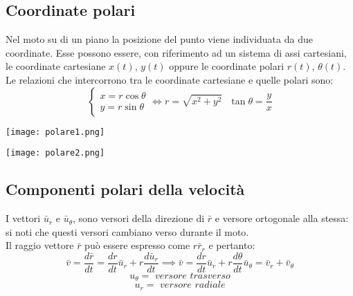 \documentclass[../../main.tex]{subfiles}
\begin{document}
\subsection{Coordinate polari}
Nel moto su di un piano la posizione del punto viene individuata da due coordinate. Esse possono essere, con riferimento ad un sistema di assi cartesiani, le coordinate cartesiane $x(t)$, $y(t)$ oppure le coordinate polari $r(t)$, $\theta(t)$. Le relazioni che intercorrono tra le coordinate cartesiane e quelle polari sono:
\[
    \begin{cases}
        x = r\cos\theta \\
        y = r\sin\theta
    \end{cases}
    \iff r = \sqrt{x^2 + y^2} \ \ \ \tan\theta = \dfrac{y}{x}
\]
\begin{minipage}{0.5\textwidth}
    \centering
    \texttt{[image: polare1.png]}
\end{minipage}
\begin{minipage}{0.5\textwidth}
    \centering
    \texttt{[image: polare2.png]}
\end{minipage}

\subsection{Componenti polari della velocità}
I vettori $\bar{u}_r$ e $\bar{u}_\theta$, sono versori della direzione di $\bar r$ e versore ortogonale alla stessa: si noti che questi versori cambiano verso durante il moto.\\
Il raggio vettore $\bar r$ può essere espresso come $r\bar r_r$ e pertanto:
\[
    \bar v = \dfrac{d\bar r}{dt} = \dfrac{dr}{dt}\bar u_r + r\dfrac{d\bar u_r}{dt} \implies \bar v = \dfrac{dr}{dt}\bar u_r + r\dfrac{d\theta}{dt}\bar u_\theta = \bar v_r + \bar v_\theta
\]
\[
    u_\theta = \textit{ versore trasverso}
\]
\[
    u_r = \textit{ versore radiale}
\]
\end{document}
